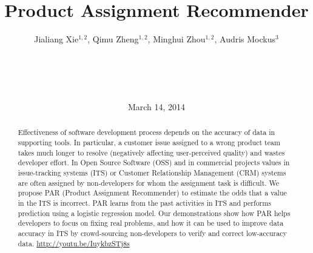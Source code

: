 \documentclass{sig-alternate}
\begin{document}
%

\title{Product Assignment Recommender}

\author{
           Jialiang Xie$^{1,2}$, Qimu Zheng$^{1,2}$, Minghui Zhou$^{1,2}$, Audris Mockus$^3$\\
       \\
       \\
       \\ \\
 }
\date{March 14, 2014}


\maketitle
\begin{abstract}
  Effectiveness of software development process depends on the
  accuracy of data in supporting tools. In particular, a customer
  issue assigned to a wrong product team takes much longer to
  resolve (negatively affecting user-perceived quality) and wastes
  developer effort. In Open Source Software (OSS) and in commercial projects
  values in issue-tracking systems (ITS) or Customer
  Relationship Management (CRM) systems are often assigned by
  non-developers for whom the assignment task is difficult.
  We propose PAR (Product Assignment Recommender) to
  estimate the odds that a value in the ITS is
  incorrect. PAR learns from the past activities in ITS and performs
  prediction using a logistic regression model. Our demonstrations show how
  PAR helps developers to focus on fixing real problems, and how it can
  be used to improve data accuracy in ITS by crowd-sourcing
  non-developers to verify and correct low-accuracy data.  \url{http://youtu.be/IuykbzSTj8s}
\end{abstract}
\vspace{-.3cm}
\vspace{-.2cm}
\vspace{-.2cm}
\end{document}
